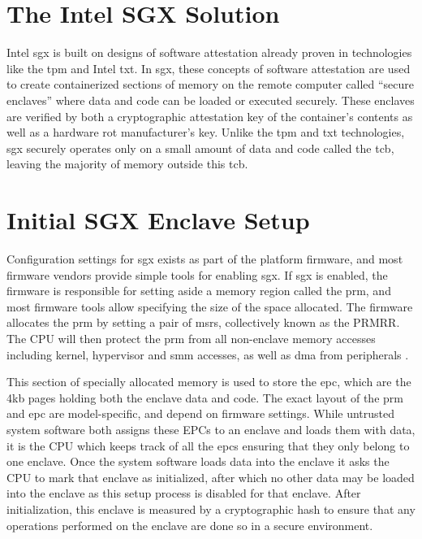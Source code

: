 \section{The Intel SGX Solution}
Intel \gls{sgx} is built on designs of software attestation already proven in technologies like the \gls{tpm} and Intel \gls{txt}. In \gls{sgx}, these concepts of software attestation are used to create containerized sections of memory on the remote computer called ``secure enclaves'' where data and code can be loaded or executed securely. These enclaves are verified by both a cryptographic attestation key of the container’s contents as well as a hardware \gls{rot} manufacturer’s key. Unlike the \gls{tpm} and \gls{txt} technologies, \gls{sgx} securely operates only on a small amount of data and code called the \gls{tcb}, leaving the majority of memory outside this \gls{tcb}.
\section{Initial SGX Enclave Setup}
Configuration settings for \gls{sgx} exists as part of the platform firmware, and most firmware vendors provide simple tools for enabling \gls{sgx}. If \gls{sgx} is enabled, the firmware is responsible for setting aside a memory region called the \gls{prm}, and most firmware tools allow specifying the size of the space allocated. The firmware allocates the \gls{prm} by setting a pair of \glspl{msr}, collectively known as the PRMRR. The CPU will then protect the \gls{prm} from all non-enclave memory accesses including kernel, hypervisor and \gls{smm} accesses, as well as \gls{dma} from peripherals \cite{Costan2016}. 

This section of specially allocated memory is used to store the \gls{epc}, which are the 4kb pages holding both the enclave data and code. The exact layout of the \gls{prm} and \gls{epc} are model-specific, and depend on firmware settings. While untrusted system software both assigns these EPCs to an enclave and loads them with data, it is the CPU which keeps track of all the \gls{epc}s ensuring that they only belong to one enclave. Once the system software loads data into the enclave it asks the CPU to mark that enclave as initialized, after which no other data may be loaded into the enclave as this setup process is disabled for that enclave. After initialization, this enclave is measured by a cryptographic hash to ensure that any operations performed on the enclave are done so in a secure environment.
\vspace{10 mm}

